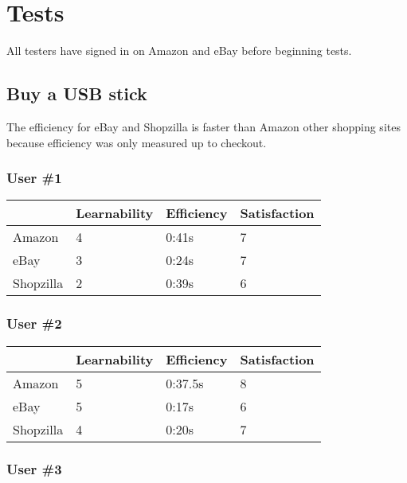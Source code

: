 \documentclass[11pt, oneside]{article}   	%
\begin{document}
\section{Tests}

All testers have signed in on Amazon and eBay before beginning tests.

\subsection{Buy a USB stick}

The efficiency for eBay and Shopzilla is faster than Amazon other shopping sites because efficiency was only measured up to checkout.

\subsubsection{User \#1}

\begin{tabular}{| l | l | l | l |}
    \hline
     & Learnability & Efficiency & Satisfaction \\ \hline
    Amazon & 4 & 0:41s & 7 \\ \hline
    eBay & 3 & 0:24s & 7 \\ \hline
    Shopzilla & 2 & 0:39s & 6 \\\hline
\end{tabular}

\subsubsection{User \#2}

\begin{tabular}{| l | l | l | l |}
    \hline
     & Learnability & Efficiency & Satisfaction \\ \hline
    Amazon & 5 & 0:37.5s & 8 \\ \hline
    eBay & 5 & 0:17s & 6 \\ \hline
    Shopzilla & 4 & 0:20s & 7 \\ \hline
\end{tabular}

\subsubsection{User \#3}
\end{document}
